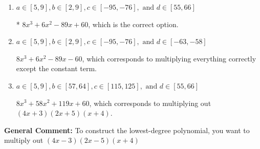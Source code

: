 \documentclass{extbook}[14pt]
\begin{document}
\begin{enumerate}
{\begin{enumerate}[label=\Alph*.]
$8x^{3} -6 x^{2} -89 x -60$, which corresponds to multiplying out $(4x + 3)(2x + 5)(x -4)$.
\item \( a \in [5, 9], b \in [2, 9], c \in [-95, -76], \text{ and } d \in [55, 66] \)

* $8x^{3} +6 x^{2} -89 x + 60$, which is the correct option.
\item \( a \in [5, 9], b \in [2, 9], c \in [-95, -76], \text{ and } d \in [-63, -58] \)

$8x^{3} +6 x^{2} -89 x -60$, which corresponds to multiplying everything correctly except the constant term.
\item \( a \in [5, 9], b \in [57, 64], c \in [115, 125], \text{ and } d \in [55, 66] \)

$8x^{3} +58 x^{2} +119 x + 60$, which corresponds to multiplying out $(4x + 3)(2x + 5)(x + 4)$.
\end{enumerate}

\textbf{General Comment:} To construct the lowest-degree polynomial, you want to multiply out $(4x -3)(2x -5)(x + 4)$
}
\end{enumerate}
\end{document}
